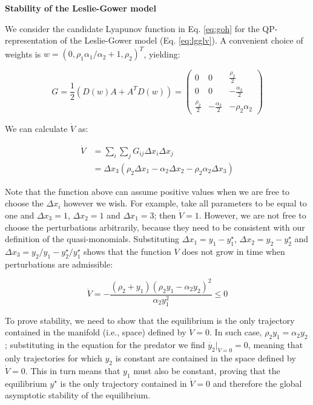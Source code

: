 \documentclass{article}
\begin{document}
\begin{cb}
\textbf{Stability of the Leslie-Gower model}

We consider the candidate Lyapunov function in Eq. \ref{eq:goh} for the QP-representation of the Leslie-Gower model (Eq. \ref{eq:lgglv}). A convenient choice of weights is $w = (0, \rho_1 \alpha_1 / \alpha_2 + 1, \rho_2)^T$, yielding:

\begin{equation}
G =\frac{1}{2} (D(w)A + A^T D(w)) =
\begin{pmatrix}
0 & 0 & \frac{\rho_2}{2} \\
0 & 0 & -\frac{\alpha_2}{2} \\
\frac{\rho_2}{2} & -\frac{\alpha_2}{2} & -\rho_2 \alpha_2
\end{pmatrix}
\end{equation}

We can calculate $\dot{V}$ as:

\begin{equation}
\begin{aligned}
\dot{V} &= \sum_i \sum_j G_{ij} \Delta x_i \Delta x_j\\
&= \Delta x_3 (\rho_2 \Delta x_1 - \alpha_2 \Delta x_2 - \rho_2 \alpha_2 \Delta x_3)
\end{aligned}
\end{equation}

Note that the function above can assume positive values when we are free to choose the $\Delta x_i$ however we wish. For example, take all parameters to be equal to one and $\Delta x_3 = 1$, $\Delta x_2 = 1$ and $\Delta x_1 = 3$; then $\dot{V} = 1$. However, we are not free to choose the perturbations arbitrarily, because they need to be consistent with our definition of the quasi-monomials. Substituting $\Delta x_1 = y_1 - y_1^\star$, $\Delta x_2 = y_2 - y_2^\star$ and $\Delta x_3 = y_2/y_1 - y_2^\star / y_1^\star$ shows that the function $V$ does not grow in time when perturbations are admissible:

\begin{equation}
\dot{V} = -\frac{(\rho_2 + y_1) (\rho_2 y_1 - \alpha_2 y_2)^2}{\alpha_2 y_1^2} \leq 0
\end{equation}

To prove stability, we need to show that the equilibrium is the only trajectory contained in the manifold (i.e., space) defined by $\dot{V} = 0$. In such case, $\rho_2 y_1 = \alpha_2 y_2$; substituting in the equation for the predator we find $\dot{y_2}|_{\dot{V} = 0} = 0$, meaning that only trajectories for which $y_2$ is constant are contained in the space defined by $\dot{V} = 0$. This in turn means that $y_1$ must also be constant, proving that the equilibrium $y^\star$ is the only trajectory contained in $\dot{V} = 0$ and therefore the global asymptotic stability of the equilibrium.
\end{cb}
\end{document}
